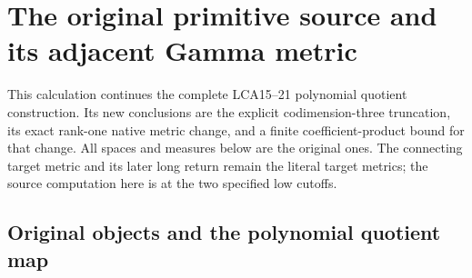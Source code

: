 \documentclass[10pt]{article}
\begin{document}
\section{The original primitive source and its adjacent Gamma metric}
\label{sec:PDS}

This calculation continues the complete LCA15--21 polynomial quotient
construction. Its new conclusions are the explicit codimension-three
truncation, its exact rank-one native metric change, and a finite
coefficient-product bound for that change. All spaces and measures below
are the original ones. The connecting target metric and its later
long return remain the literal target metrics; the source computation
here is at the two specified low cutoffs.

\subsection{Original objects and the polynomial quotient map}
\end{document}
